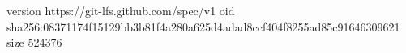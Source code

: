 version https://git-lfs.github.com/spec/v1
oid sha256:08371174f15129bb3b81f4a280a625d4adad8ccf404f8255ad85c91646309621
size 524376
